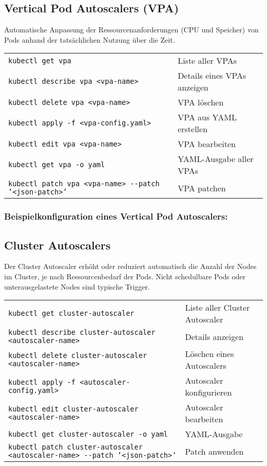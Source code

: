 \subsection{Vertical Pod Autoscalers (VPA)}
Automatische Anpassung der Ressourcenanforderungen (CPU und Speicher) von Pods anhand der tatsächlichen Nutzung über die Zeit. \\

\noindent
\begin{tabular}{|p{}|p{}|}
\hline
\texttt{kubectl get vpa} & Liste aller VPAs \\
\texttt{kubectl describe vpa <vpa-name>} & Details eines VPAs anzeigen \\
\texttt{kubectl delete vpa <vpa-name>} & VPA löschen \\
\texttt{kubectl apply -f <vpa-config.yaml>} & VPA aus YAML erstellen \\
\texttt{kubectl edit vpa <vpa-name>} & VPA bearbeiten \\
\texttt{kubectl get vpa -o yaml} & YAML-Ausgabe aller VPAs \\
\texttt{kubectl patch vpa <vpa-name> {-}{-}patch '<json-patch>'} & VPA patchen \\
\hline
\end{tabular}
\subsubsection{Beispielkonfiguration eines Vertical Pod Autoscalers:}



\subsection{Cluster Autoscalers}
Der Cluster Autoscaler erhöht oder reduziert automatisch die Anzahl der Nodes im Cluster, je nach Ressourcenbedarf der Pods. Nicht schedulbare Pods oder unterausgelastete Nodes sind typische Trigger. \\

\noindent
\begin{tabular}{|p{}|p{}|}
\hline
\texttt{kubectl get cluster-autoscaler} & Liste aller Cluster Autoscaler \\
\texttt{kubectl describe cluster-autoscaler <autoscaler-name>} & Details anzeigen \\
\texttt{kubectl delete cluster-autoscaler <autoscaler-name>} & Löschen eines Autoscalers \\
\texttt{kubectl apply -f <autoscaler-config.yaml>} & Autoscaler konfigurieren \\
\texttt{kubectl edit cluster-autoscaler <autoscaler-name>} & Autoscaler bearbeiten \\
\texttt{kubectl get cluster-autoscaler -o yaml} & YAML-Ausgabe \\
\texttt{kubectl patch cluster-autoscaler <autoscaler-name> {-}{-}patch '<json-patch>'} & Patch anwenden \\
\hline
\end{tabular}
